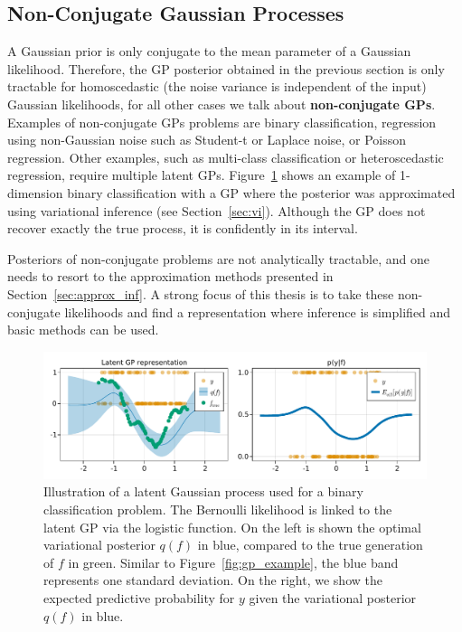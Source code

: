 \subsection{Non-Conjugate Gaussian Processes}
\label{sec:nonconj_gps}
A Gaussian prior is only conjugate to the mean parameter of a Gaussian likelihood.
Therefore, the \ac{GP} posterior obtained in the previous section is only tractable for homoscedastic (the noise variance is independent of the input) Gaussian likelihoods, for all other cases we talk about \textbf{non-conjugate \ac{GPs}}.
Examples of non-conjugate \ac{GPs} problems are binary classification, regression using non-Gaussian noise such as Student-t or Laplace noise, or Poisson regression.
Other examples, such as multi-class classification or heteroscedastic regression, require multiple latent \ac{GPs}.
Figure~\ref{fig:gp_class_example} shows an example of 1-dimension binary classification with a \ac{GP} where the posterior was approximated using variational inference (see Section~\ref{sec:vi}).
Although the \ac{GP} does not recover exactly the true process, it is confidently in its interval.

Posteriors of non-conjugate problems are not analytically tractable, and one needs to resort to the approximation methods presented in Section~\ref{sec:approx_inf}.
A strong focus of this thesis is to take these non-conjugate likelihoods and find a representation where inference is simplified and basic methods can be used.

\begin{figure}
    \includegraphics[width=\textwidth]{./chapters/2_background/figures/GP_classification_example.pdf}
    \caption{Illustration of a latent Gaussian process used for a binary classification problem.
    The Bernoulli likelihood is linked to the latent \ac{GP} via the logistic function.
    On the left is shown the optimal variational posterior $q(f)$ in blue, compared to the true generation of $f$ in green.
    Similar to Figure~\ref{fig:gp_example}, the blue band represents one standard deviation.
    On the right, we show the expected predictive probability for $y$ given the variational posterior $q(f)$ in blue.}
    \label{fig:gp_class_example}
\end{figure}

